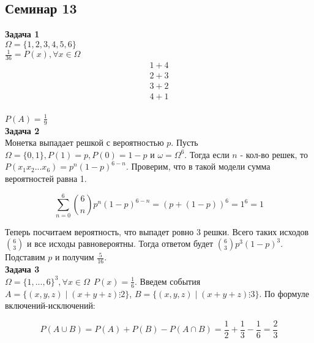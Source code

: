 \subsection{Семинар 13}
\textbf{Задача 1}\\

$\Omega = \{1, 2,  3, 4, 5, 6\}$\\

$\frac{1}{36} = P(x), \forall x \in \Omega$\\

\begin{equation*}
\begin{array}{c}
1 + 4\\
2+ 3\\
3 + 2\\
4 + 1\\    
\end{array}
\end{equation*}

$P(A) = \frac{1}{9}$\\

\textbf{Задача 2}\\

Монетка выпадает решкой с вероятностью $p$. Пусть $\Omega = \{0, 1\}, P(1) = p, P(0) = 1 -p$ и $\omega = \Omega^6$.
Тогда если $n$ - кол-во решек, то $P(x_1x_2 ... x_6) = p^n(1 - p)^{6 - n}$. Проверим, что в такой модели сумма вероятностей равна 1.

\begin{equation*}
    \sum\limits_{n = 0}^{6} \binom{6}{n} p^n(1 - p)^{6 - n} = (p + (1 - p))^6 = 1^6 = 1
\end{equation*}

Теперь посчитаем вероятность, что выпадет ровно 3 решки. Всего таких исходов $\binom{6}{3}$ и все исходы равновероятны. Тогда
ответом будет $\binom{6}{3} p^3(1 - p)^{3}$. Подставим $p$ и получим $\frac{5}{16}$.\\

\textbf{Задача 3}\\

$\Omega = \{1, ..., 6\}^3, \forall x \in \Omega \ \ P(x) = \frac{1}{6}$. Введем события $A = \{(x, y, z) \mid (x + y + z) \vdots 2 \}$,
$B = \{(x, y, z) \mid (x + y + z) \vdots 3 \}$. По формуле включений-исключений:

\begin{equation*}
    P(A \cup B) = P(A) + P(B) - P(A \cap B) = \frac{1}{2} + \frac{1}{3} - \frac{1}{6} = \frac{2}{3}
\end{equation*}

